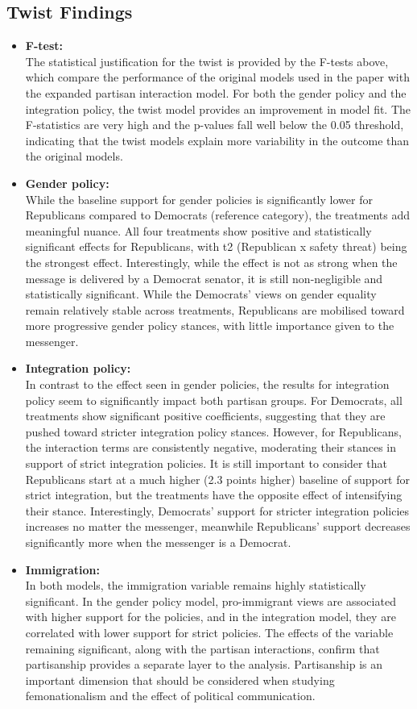 \documentclass[12pt,letterpaper]{article}
\begin{document}
		\subsection*{Twist Findings}
		\begin{itemize}
			\item \textbf{F-test:} \\[.2cm]
				The statistical justification for the twist is provided by the F-tests above, which compare the performance of the original models used in the paper with the expanded partisan interaction model. For both the gender policy and the integration policy, the twist model provides an improvement in model fit. The F-statistics are very high and the p-values fall well below the 0.05 threshold, indicating that the twist models explain more variability in the outcome than the original models.
			\item \textbf{Gender policy:} \\[.2cm]
				While the baseline support for gender policies is significantly lower for Republicans compared to Democrats (reference category), the treatments add meaningful nuance. All four treatments show positive and statistically significant effects for Republicans, with t2 (Republican x safety threat) being the strongest effect. Interestingly, while the effect is not as strong when the message is delivered by a Democrat senator, it is still non-negligible and statistically significant. While the Democrats’ views on gender equality remain relatively stable across treatments, Republicans are mobilised toward more progressive gender policy stances, with little importance given to the messenger. 
			\item \textbf{Integration policy:} \\[.2cm]
				In contrast to the effect seen in gender policies, the results for integration policy seem to significantly impact both partisan groups. For Democrats, all treatments show significant positive coefficients, suggesting that they are pushed toward stricter integration policy stances. However, for Republicans, the interaction terms are consistently negative, moderating their stances in support of strict integration policies. It is still important to consider that Republicans start at a much higher (2.3 points higher) baseline of support for strict integration, but the treatments have the opposite effect of intensifying their stance. Interestingly, Democrats' support for stricter integration policies increases no matter the messenger, meanwhile Republicans' support decreases significantly more when the messenger is a Democrat. 
			\item \textbf{Immigration:} \\[.2cm]
			In both models, the immigration variable remains highly statistically significant. In the gender policy model, pro-immigrant views are associated with higher support for the policies, and in the integration model, they are correlated with lower support for strict policies. The effects of the variable remaining significant, along with the partisan interactions, confirm that partisanship provides a separate layer to the analysis. Partisanship is an important dimension that should be considered when studying femonationalism and the effect of political communication. 
		\end{itemize}
\end{document}
